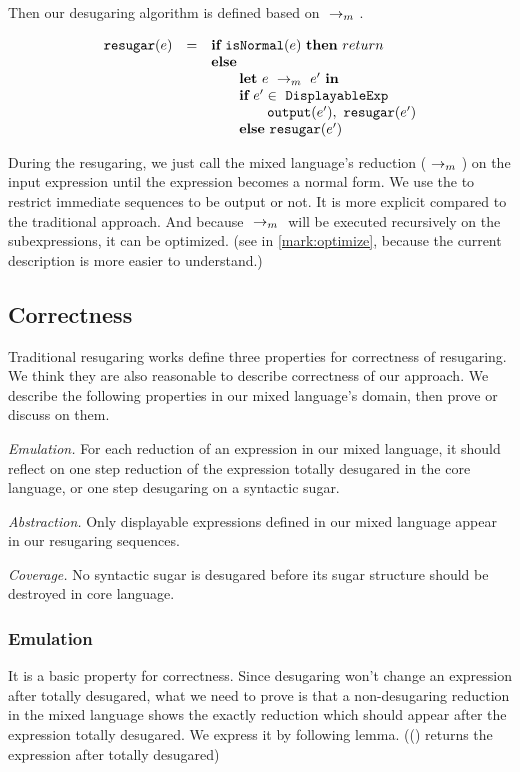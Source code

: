 
Then our desugaring algorithm is defined based on $~\rightarrow_m~$.

\[
\begin{array}{llll}
\mbox{\tt resugar} (e) &=& \mbox{\rm \bf if}~\mbox{\tt isNormal}(e)~\mbox{\rm \bf then}~return\\
              & & \mbox{\rm \bf else}~\\
							& & \qquad \mbox{\rm \bf let}~e ~\rightarrow_m~e'~\mbox{\rm \bf in}\\
							& & \qquad \mbox{\rm \bf if}~e' \in~\mbox{\tt DisplayableExp} \\
							& & \qquad \qquad \mbox{\tt output}(e'),~\mbox{\tt resugar}(e')\\
							& & \qquad \mbox{\rm \bf else}~\mbox{\tt resugar}(e')
\end{array}
\]

During the resugaring, we just call the mixed language's reduction ($~\rightarrow_m~$) on the input expression until the expression becomes a normal form. We use the  to restrict immediate sequences to be output or not. It is more explicit compared to the traditional approach. And because $~\rightarrow_m~$ will be executed recursively on the subexpressions, it can be optimized. (see in \ref{mark:optimize}, because the current description is more easier to understand.)

\subsection{Correctness}
\label{mark:correct}

Traditional resugaring works\cite{resugaring,hygienic} define three properties for correctness of resugaring. We think they are also reasonable to describe correctness of our approach. We describe the following properties in our mixed language's domain, then prove or discuss on them.

\emph{Emulation.} For each reduction of an expression in our mixed language, it should reflect on one step reduction of the expression totally desugared in the core language, or one step desugaring on a syntactic sugar.

\emph{Abstraction.} Only displayable expressions defined in our mixed language appear in our resugaring sequences.

\emph{Coverage.} No syntactic sugar is desugared before its sugar structure should be destroyed in core language.

\subsubsection{Emulation} It is a basic property for correctness. Since desugaring won't change an expression after totally desugared, what we need to prove is that a non-desugaring reduction in the mixed language shows the exactly reduction which should appear after the expression totally desugared. We express it by following lemma. (() returns the expression after  totally desugared)

